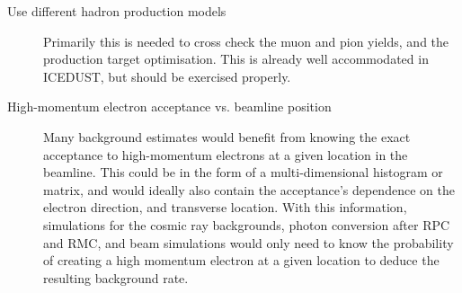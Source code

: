 \begin{description}
	\item[Use different hadron production models] Primarily this is needed to cross check the muon and pion yields, and the production target optimisation.
		This is already well accommodated in ICEDUST, but should be exercised properly.
	\item[High-momentum electron acceptance vs. beamline position] Many background estimates would benefit from knowing the exact acceptance to high-momentum electrons at a given location in the beamline.
		This could be in the form of a multi-dimensional histogram or matrix, and would ideally also contain the acceptance's dependence on the electron direction, and transverse location.
		With this information, simulations for the cosmic ray backgrounds, photon conversion after RPC and RMC, and beam simulations would only need to know the probability of creating a high momentum electron at a given location to deduce the resulting background rate.
\end{description}
